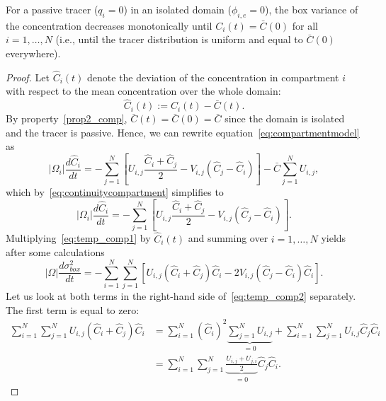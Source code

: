 \begin{property} \label{prop3_comp}
	For a passive tracer ($q_i = 0$) in an isolated domain ($\phi_{i,e} = 0$), the box variance of the concentration decreases monotonically until $C_i(t) = \bar{C}(0)$ for all $i = 1,\dots,N$ (i.e., until the tracer distribution is uniform and equal to $\bar C(0)$ everywhere).
\end{property}
\begin{proof}
	Let $\hat{C}_i(t)$ denote the deviation of the concentration in compartment $i$ with respect to the mean concentration over the whole domain:
	\begin{equation}
		\hat{C}_i(t) := C_i(t) - \bar C(t).
	\end{equation}
	By property~\ref{prop2_comp}, $\bar C(t) = \bar C(0) = \bar C$ since the domain is isolated and the tracer is passive. Hence, we can rewrite equation~\eqref{eq:compartmentmodel} as 
	\begin{equation}
		|\Omega_i| \frac{d\hat C_i}{dt} = - \sum_{j=1}^N \left[ U_{i,j}\frac{\hat C_i + \hat C_j}{2} - V_{i,j} (\hat C_j - \hat C_i)\right] - \bar C \sum_{j=1}^N U_{i,j},
	\end{equation}
	which by~\eqref{eq:continuitycompartment} simplifies to
	\begin{equation} \label{eq:temp_comp1}
		|\Omega_i| \frac{d\hat C_i}{dt} = - \sum_{j=1}^N \left[ U_{i,j}\frac{\hat C_i + \hat C_j}{2} - V_{i,j} (\hat C_j - \hat C_i)\right].
	\end{equation}
	Multiplying~\eqref{eq:temp_comp1} by $\hat C_i(t)$ and summing over $i = 1,\dots,N$ yields after some calculations
	\begin{equation} \label{eq:temp_comp2}
		|\Omega| \frac{d \sigma^2_{box}}{dt} = - \sum_{i=1}^N \sum_{j=1}^N \left[ U_{i,j}(\hat C_i + \hat C_j)\hat C_i - 2 V_{i,j} (\hat C_j - \hat C_i) \hat C_i\right].
	\end{equation}
	Let us look at both terms in the right-hand side of~\eqref{eq:temp_comp2} separately. The first term is equal to zero:
	\begin{subequations}
	 	\begin{align}
	 		\sum_{i=1}^N \sum_{j=1}^N U_{i,j}(\hat C_i + \hat C_j)\hat C_i &= \sum_{i=1}^N \left(\hat C_i \right)^2 \underbrace{\sum_{j=1}^N U_{i,j}}_{= 0} + \sum_{i=1}^N \sum_{j=1}^N U_{i,j}\hat C_j\hat C_i\\
	 		&= \sum_{i=1}^N \sum_{j=1}^N \underbrace{\frac{U_{i,j} + U_{j,i}}{2}}_{=0}\hat C_j\hat C_i.
	 	\end{align}
	 \end{subequations} 

\end{proof}

